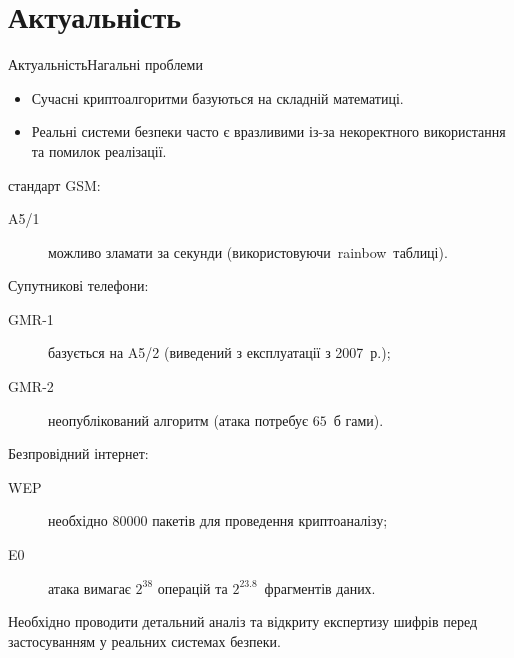 \documentclass[10pt, ucs, handout]{beamer}
\title[Криптографічні властивості симетричних шифрів]{\worktitle}
\author[\workauthors]{
    \texorpdfstring{Руслан Кіянчук\\[2ex]
    \scriptsize\url{ruslan.kiyanchuk@gmail.com}}{\workauthors} \\[4ex]%
    \begin{flushleft}
    \hspace*{10em}
    \normalsize Науковий керівник: \hspace*{10ex} Халімов Г. З. \\[0.8ex]
    \hspace*{6.9em}
    \normalsize Консультант: \hspace*{15.8ex} Олійников Р. В.
\end{flushleft} \\[-8ex]
}
\subtitle{Бакалаврська робота}
\institute[ХНУРЕ]{}
\date[Харків 2012]{\normalsize Харків 2012}
\begin{document}
\maketitle

\section{Актуальність}
\begin{frame}{Актуальність}{Нагальні проблеми}
    \small
    \begin{block}{}
        \begin{itemize}
            \item Сучасні криптоалгоритми базуються на складній математиці.
            \item Реальні системи безпеки часто є вразливими із-за некоректного
                використання та помилок реалізації.
        \end{itemize}
    \end{block}
    \alert{стандарт GSM:}
    \begin{description}
        \item[A5/1] можливо зламати за секунди
            (використовуючи~rainbow~таблиці).
    \end{description}
    \alert{Супутникові телефони:}
    \begin{description}
        \item[GMR-1] базується на A5/2 (виведений з експлуатації з 2007~р.);
        \item[GMR-2] неопублікований алгоритм (атака потребує $65$~б гами).
    \end{description}
    \alert{Безпровідний інтернет:}
    \begin{description}
        \item [WEP] необхідно $80000$ пакетів для проведення криптоаналізу;
        \item[E0] атака вимагає $2^{38}$ операцій та $2^{23.8}$~фрагментів
            даних.
    \end{description}
    \begin{block}{}
        Необхідно проводити детальний аналіз та відкриту експертизу шифрів
        перед застосуванням у реальних системах безпеки.
    \end{block}
\end{frame}
\end{document}
